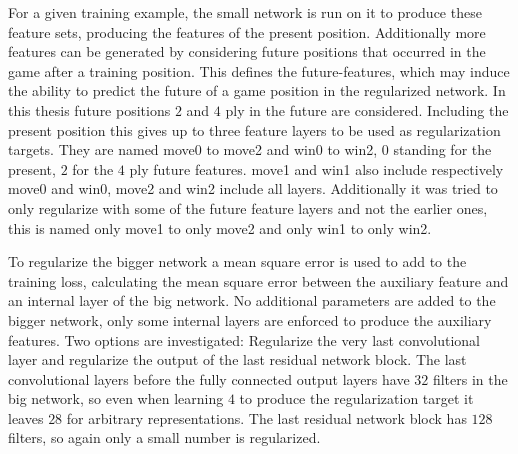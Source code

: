 \documentclass[12pt,onecolumn,oneside,titlepage]{article}
\begin{document}
For a given training example, the small network is run on it to produce these feature sets, producing the features of the present position. Additionally more features can be generated by considering future positions that occurred in the game
after a training position. This defines the future-features, which may induce the ability to predict the future of a game position in the regularized network. In this thesis future positions $2$ and $4$  ply in the future are considered.
Including the present position this gives up to three feature layers to be used as regularization targets. They are named move0 to move2 and win0 to win2, $0$ standing for the present, $2$ for the $4$ ply future features. move1 and win1 also include respectively move0 and win0,
move2 and win2 include all layers. Additionally it was tried to only regularize with some of the future feature layers and not the earlier ones, this is named only move1 to only move2 and only win1 to only win2.

To regularize the bigger network a mean square error is used to add to the training loss, calculating the mean square error between the auxiliary feature and an internal layer of the big network. No additional parameters are added to the bigger network,
only some internal layers are enforced to produce the auxiliary features. Two options are investigated: Regularize the very last convolutional layer and regularize the output of the last residual network block. The last convolutional layers before
the fully connected output layers have $32$ filters in the big network, so even when learning $4$ to produce the regularization target it leaves $28$ for arbitrary representations. The last residual network block has $128$ filters, so again only a small number is regularized.
\end{document}
